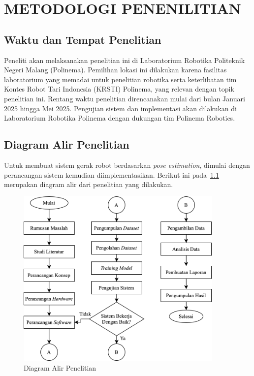 \chapter{METODOLOGI PENENILITIAN}

\vspace{1em}
\section{Waktu dan Tempat Penelitian}

Peneliti akan melaksanakan penelitian ini di Laboratorium Robotika Politeknik Negeri Malang (Polinema). Pemilihan lokasi ini dilakukan karena fasilitas laboratorium yang memadai untuk penelitian robotika serta keterlibatan tim Kontes Robot Tari Indonesia (KRSTI) Polinema, yang relevan dengan topik penelitian ini. Rentang waktu penelitian direncanakan mulai dari bulan Januari 2025 hingga Mei 2025. Pengujian sistem dan implementasi akan dilakukan di Laboratorium Robotika Polinema dengan dukungan tim Polinema Robotics.

\section{Diagram Alir Penelitian}

Untuk membuat sistem gerak robot berdasarkan \textit{pose estimation}, dimulai dengan perancangan sistem kemudian diimplementasikan. Berikut ini pada~\ref{fig:flowchart_penelitian} merupakan diagram alir dari penelitian yang dilakukan.

\begin{figure}[H]
    \centering
    \includegraphics[width=0.9\textwidth]{images/flowchart_penelitian.png}
    \caption{Diagram Alir Penelitian}
    \label{fig:flowchart_penelitian}
\end{figure}

